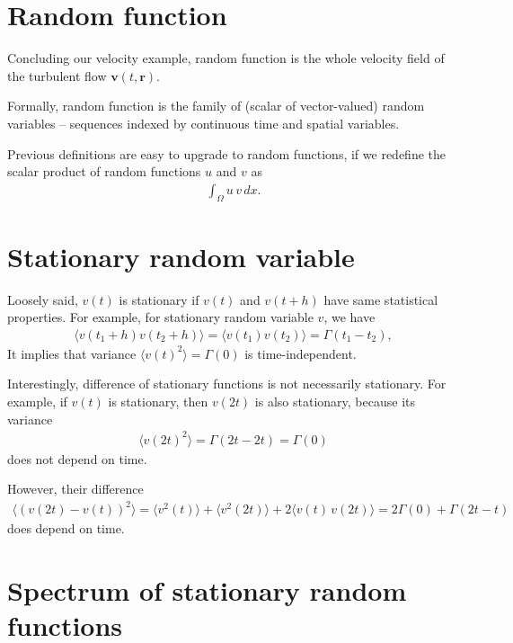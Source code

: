 \section{Random function}
Concluding our velocity example, random function is the whole velocity field of the turbulent flow
$\bm{v}(t,\bm{r})$.

Formally, random function is the family of (scalar of vector-valued) random variables -- sequences indexed by continuous time and spatial variables.

\bigskip

Previous definitions are easy to upgrade to random functions, if we redefine the scalar product of random functions $u$ and $v$ as
\begin{align}
\int_{\Omega} u \, v \, dx.
\end{align}

\section{Stationary random variable}
Loosely said, $v(t)$ is stationary if $v(t)$ and $v(t+h)$ have same statistical properties.
For example, for stationary random variable $v$, we have
\begin{align*}
\langle v(t_1+h) v(t_2 + h) \rangle = \langle v(t_1) v(t_2) \rangle = \Gamma(t_1 - t_2),
\end{align*}
It implies that variance $\langle v(t)^2 \rangle = \Gamma(0)$ is time-independent.

Interestingly, difference of stationary functions is not necessarily stationary. 
For example, if $v(t)$ is stationary, then $v(2t)$ is also stationary, because its variance
\begin{align*}
\langle v(2t)^2 \rangle = \Gamma(2t - 2t) = \Gamma(0)
\end{align*}
does not depend on time.

However, their difference
\begin{align}
\langle (v(2t) - v(t))^2 \rangle = \langle v^2(t) \rangle + \langle v^2(2t) \rangle + 2\langle v(t)\,v(2t) \rangle = 2\Gamma(0) + \Gamma(2t - t)
\end{align} 
does depend on time.

\section{Spectrum of stationary random functions}

